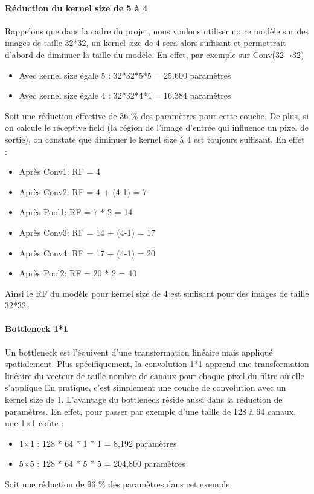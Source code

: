 \documentclass[12pt,a4paper]{article}
\begin{document}
\paragraph{Réduction du kernel size de 5 à 4 }
Rappelons que dans la cadre du projet, nous voulons utiliser notre modèle sur des images de taille 32*32, un kernel size de 4 sera alors suffisant et permettrait d'abord de diminuer la taille du modèle. 
En effet, par exemple sur Conv(32→32)
\begin{itemize}
    \item Avec kernel size égale 5 : 32*32*5*5 = 25.600 paramètres
    \item Avec kernel size égale 4 : 32*32*4*4 = 16.384 paramètres
\end{itemize}
Soit une réduction effective de 36 \% des paramètres pour cette couche.
De plus, si on calcule le réceptive field (la région de l'image d'entrée qui influence un pixel de sortie), on constate que diminuer le kernel size à 4 est toujours suffisant. En effet : 
\begin{itemize}
\item Après Conv1: RF = 4
\item Après Conv2: RF = 4 + (4-1) = 7
\item Après Pool1: RF = 7 * 2 = 14
\item Après Conv3: RF = 14 + (4-1) = 17
\item Après Conv4: RF = 17 + (4-1) = 20
\item Après Pool2: RF = 20 * 2 = 40
\end{itemize}
Ainsi le RF du modèle pour kernel size de 4 est suffisant pour des images de taille 32*32. 
\paragraph{Bottleneck 1*1}
Un bottleneck est l'équivent d'une transformation linéaire mais appliqué spatialement. Plus spécifiquement, la convolution 1*1 apprend une transformation linéaire du vecteur de taille nombre de canaux pour chaque pixel du filtre où elle s'applique
En pratique, c'est simplement une couche de convolution avec un kernel size de 1. L'avantage du bottleneck réside aussi dans la réduction de paramètres. 
En effet, pour passer par exemple d'une taille de 128 à 64 canaux, une 1×1 coûte :
\begin{itemize}
   \item 1×1 : 128 * 64 * 1 * 1 = 8,192 paramètres
   \item 5×5 : 128 * 64 * 5 * 5 = 204,800 paramètres
\end{itemize}
Soit une réduction de 96 \% des paramètres dans cet exemple. 
\end{document}
